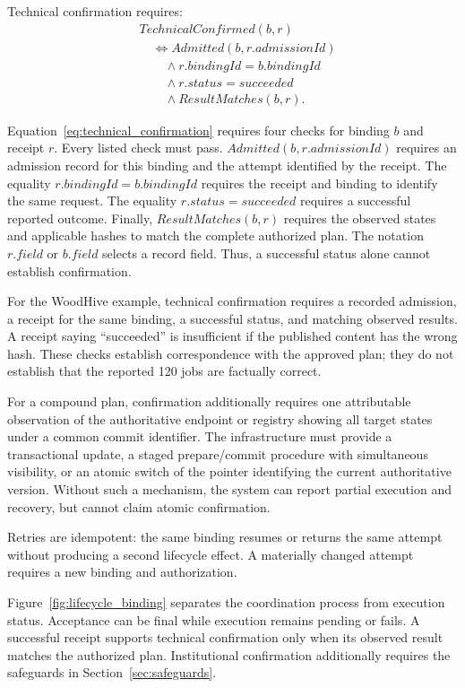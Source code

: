 \documentclass[journal]{IEEEtran}
\begin{document}
Technical confirmation requires:
\begin{equation}
\label{eq:technical_confirmation}
\begin{aligned}
&TechnicalConfirmed(b,r)\\
&\quad\iff Admitted(b,r.admissionId)\\
&\qquad\land r.bindingId=b.bindingId\\
&\qquad\land r.status=\mathit{succeeded}\\
&\qquad\land ResultMatches(b,r).
\end{aligned}
\end{equation}

Equation~\ref{eq:technical_confirmation} requires four checks for
binding $b$ and receipt $r$. Every listed check must pass.
$Admitted(b,r.admissionId)$ requires an admission record for this
binding and the attempt identified by the receipt. The equality
$r.bindingId=b.bindingId$ requires the receipt and binding to
identify the same request. The equality
$r.status=\mathit{succeeded}$ requires a successful reported
outcome. Finally, $ResultMatches(b,r)$ requires the observed states
and applicable hashes to match the complete authorized plan.
The notation $r.field$ or $b.field$ selects a record field.
Thus, a successful status alone cannot establish confirmation.

For the WoodHive example, technical confirmation requires a
recorded admission, a receipt for the same binding, a successful
status, and matching observed results. A receipt saying
``succeeded'' is insufficient if the published content has the
wrong hash. These checks establish correspondence with the
approved plan; they do not establish that the reported 120 jobs
are factually correct.

For a compound plan, confirmation additionally requires
one attributable observation of the authoritative endpoint
or registry showing all target states under a common commit
identifier. The infrastructure must provide a transactional
update, a staged prepare/commit procedure with simultaneous
visibility, or an atomic switch of the pointer identifying
the current authoritative version. Without such a mechanism,
the system can report partial execution and recovery, but
cannot claim atomic confirmation.

Retries are idempotent: the same binding resumes or returns
the same attempt without producing a second lifecycle effect.
A materially changed attempt requires a new binding and
authorization.

Figure~\ref{fig:lifecycle_binding} separates the coordination
process from execution status. Acceptance can be final while
execution remains pending or fails. A successful receipt
supports technical confirmation only when its observed
result matches the authorized plan. Institutional confirmation
additionally requires the safeguards in
Section~\ref{sec:safeguards}.
\end{document}
